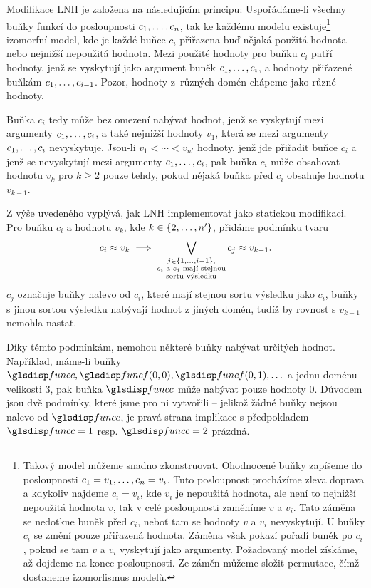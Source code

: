 Modifikace LNH \cite{lnh} je založena na následujícím principu:
Uspořádáme-li všechny buňky funkcí do
posloupnosti $c_1 , \ldots, c_n$,
tak ke každému modelu existuje\footnote{
Takový model můžeme snadno zkonstruovat. Ohodnocené buňky
zapíšeme do posloupnosti $c_1 = v_1 , \ldots, c_n = v_i$.
Tuto posloupnost procházíme zleva doprava a kdykoliv
najdeme $c_i = v_i$, kde $v_i$ je nepoužitá hodnota, ale není to nejnižší
nepoužitá hodnota $v$, tak v celé posloupnosti zaměníme
$v$ a $v_i$. Tato záměna se nedotkne buněk před $c_i$,
neboť tam se hodnoty $v$ a $v_i$ nevyskytují. U buňky $c_i$ se změní
pouze přiřazená hodnota. Záměna však pokazí pořadí buněk po $c_i$,
pokud se tam $v$ a $v_i$ vyskytují jako argumenty.
Požadovaný model získáme, až dojdeme na konec posloupnosti.
Ze záměn můžeme složit permutace, čímž dostaneme izomorfismus modelů.}
izomorfní model,
kde je každé buňce $c_i$ přiřazena buď nějaká použitá hodnota
nebo nejnižší nepoužitá hodnota.
Mezi použité hodnoty pro buňku $c_i$ patří hodnoty, jenž se vyskytují
jako argument buněk $c_1 , \ldots, c_i$, a hodnoty
přiřazené buňkám $c_1 , \ldots, c_{i-1}$.
Pozor, hodnoty z~různých domén chápeme jako různé hodnoty.

Buňka $c_i$ tedy může bez omezení nabývat hodnot, jenž se vyskytují mezi
argumenty $c_1 , \ldots, c_i$, a také nejnižší hodnoty $v_1$, která se mezi
argumenty $c_1 , \ldots, c_i$ nevyskytuje.
Jsou-li $v_1 < \cdots < v_{n'}$ hodnoty, jenž jde přiřadit buňce $c_i$
a jenž se nevyskytují mezi argumenty $c_1 , \ldots, c_i$, pak
buňka $c_i$ může obsahovat hodnotu $v_k$ pro $k \ge 2$ pouze tehdy,
pokud nějaká buňka před $c_i$ obsahuje hodnotu $v_{k-1}$.

Z výše uvedeného vyplývá, jak LNH implementovat jako statickou modifikaci.
Pro buňku $c_i$ a hodnotu
$v_k$, kde $k \in \{ 2 , \ldots, n' \}$, přidáme podmínku tvaru
\[
c_i \approx v_k \implies
  \bigvee_{\substack{
      j \in \{ 1 , \ldots, i-1 \}, \\
      \text{$c_i$ a $c_j$ mají stejnou} \\
      \text{sortu výsledku}}}
    c_j \approx v_{k-1}.
\]
$c_j$ označuje buňky nalevo od $c_i$, které mají stejnou sortu
výsledku jako $c_i$, buňky s jinou sortou výsledku
nabývají hodnot z jiných domén, tudíž by rovnost s $v_{k-1}$
nemohla nastat.

Díky těmto podmínkám, nemohou některé buňky nabývat určitých hodnot.
Například, máme-li buňky $\funcC, \func(0, 0), \func(0, 1), \ldots$
a jednu doménu velikosti 3, pak buňka $\funcC$ může nabývat pouze hodnoty
0. Důvodem jsou dvě podmínky, které jsme pro ni vytvořili --
jelikož žádné buňky nejsou nalevo od $\funcC$,
je pravá strana implikace s předpokladem
$\funcC = 1$ resp. $\funcC = 2$ prázdná.

